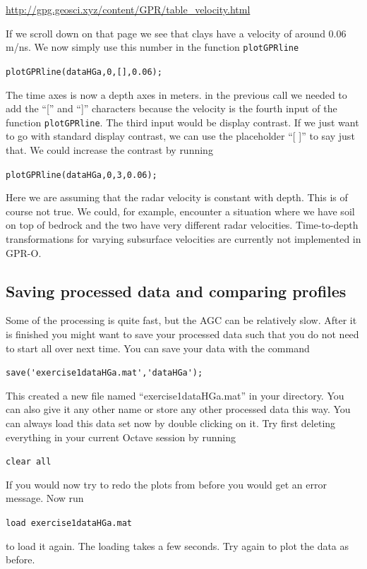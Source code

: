 \documentclass[11pt]{article}
\begin{document}
\url{http://gpg.geosci.xyz/content/GPR/table_velocity.html}
  
If we scroll down on that page we see that clays have a velocity of
around 0.06 m/ns. We now simply use this number in the function
\verb#plotGPRline#
  
\qquad \verb#plotGPRline(dataHGa,0,[],0.06);#
  
The time axes is now a depth axes in meters. in the previous call we
needed to add the ``['' and ``]'' characters because the velocity is
the fourth input of the function \verb#plotGPRline#. The third input
would be display contrast. If we just want to go with standard display
contrast, we can use the placeholder ``[ ]'' to say just that. We
could increase the contrast by running
  
\qquad \verb#plotGPRline(dataHGa,0,3,0.06);#

Here we are assuming that the radar velocity is constant with
depth. This is of course not true. We could, for example, encounter a
situation where we have soil on top of bedrock and the two have very
different radar velocities. Time-to-depth transformations for varying
subsurface velocities are currently not implemented in GPR-O.

\subsection{Saving processed data and comparing profiles}

Some of the processing is quite fast, but the AGC can be relatively
slow. After it is finished you might want to
save your processed data such that you do not need to start all over
next time. You can save your data with the command
 
\qquad \verb#save('exercise1dataHGa.mat','dataHGa');#
 
This created a new file named ``exercise1dataHGa.mat'' in your
directory. You can also give it any other name or store any other
processed data this way. You can always load this data set now by
double clicking on it. Try first deleting everything in your current
Octave session by running
 
\qquad \verb#clear all#
 
If you would now try to redo the plots from before you would get an
error message. Now run
 
\qquad \verb#load exercise1dataHGa.mat#
 
to load it again.  The loading takes a few seconds. Try again to plot
the data as before.
\end{document}
